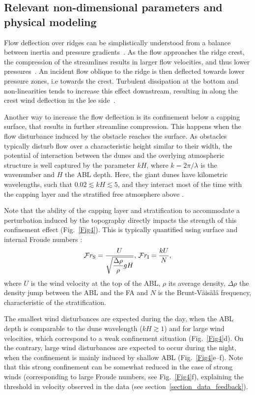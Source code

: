   \subsection{Relevant non-dimensional parameters and physical modeling}
  \label{theoretical_framework}

  Flow deflection over ridges can be simplistically understood from a balance between inertia and pressure gradients~\citep{Hesp2015}. As the flow approaches the ridge crest, the compression of the streamlines results in larger flow velocities, and thus lower pressures~\citep{Rubin1987}. An incident flow oblique to the ridge is then deflected towards lower pressure zones, i.e towards the crest. Turbulent dissipation at the bottom and non-linearities tends to increase this effect downstream, resulting in along the crest wind deflection in the lee side~\citep{Hesp2015, Gadal2019}.

  Another way to increase the flow deflection is its confinement below a capping surface, that results in further streamline compression. This happens when the flow disturbance induced by the obstacle reaches the surface. As obstacles typically disturb flow over a characteristic height similar to their width, the potential of interaction between the dunes and the overlying atmospheric structure is well captured by the parameter $k H$, where $k = 2\pi/\lambda$ is the wavenumber and $H$ the ABL depth. Here, the giant dunes have kilometric wavelengths, such that $0.02 \lesssim k H \lesssim 5$, and they interact most of the time with the capping layer and the stratified free atmosphere above \citep{andreotti2009}.

  Note that the ability of the capping layer and stratification to accommodate a perturbation induced by the topography directly impacts the strength of this confinement effect (Fig.~\ref{Fig4}). This is typically quantified using surface and internal Froude numbers
  \citep{Vosper2004, Stull2006, Sheridan2006, Hunt2006, Jiang2014}:
  \begin{equation}
        \mathcal{F}r_{\textup{S}} = \displaystyle\frac{U}{\sqrt{\displaystyle\frac{\Delta\rho}{\rho}gH}}, \, \mathcal{F}r_{\textup{I}} = \displaystyle\frac{k U}{N},
  \end{equation}
  where $U$ is the wind velocity at the top of the ABL, $\rho$ its average density, $\Delta\rho$ the density jump between the ABL and the FA and $N$ is the Brunt-Väisälä frequency, characteristic of the stratification.

  The smallest wind disturbances are expected during the day, when the ABL depth is comparable to the dune wavelength ($k H \gtrsim 1$) and for large wind velocities, which correspond to a weak confinement situation (Fig.~\ref{Fig4}d). On the contrary, large wind disturbances are expected to occur during the night, when the confinement is mainly induced by shallow ABL (Fig.~\ref{Fig4}e--f). Note that this strong confinement can be somewhat reduced in the case of strong winds (corresponding to large Froude numbers, see Fig.~\ref{Fig4}f), explaining the threshold in velocity observed in the data (see section~\ref{section_data_feedback}).

